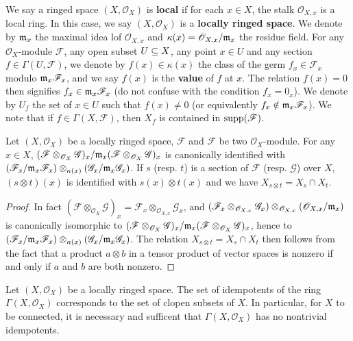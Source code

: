We say a ringed space $(X,\mathscr{O}_X)$ is \textbf{local} if for each $x\in X$, the stalk $\mathscr{O}_{X,x}$ is a local ring. In this case, we say $(X,\mathscr{O}_X)$ is a \textbf{locally ringed space}. We denote by $\mathfrak{m}_x$ the maximal idea lof $\mathscr{O}_{X,x}$ and $\kappa(x)=\mathscr{O}_{X,x}/\mathfrak{m}_x$ the residue field. For any $\mathscr{O}_X$-module $\mathscr{F}$, any open subset $U\subseteq X$, any point $x\in U$ and any section $f\in\Gamma(U,\mathscr{F})$, we denote by $f(x)\in\kappa(x)$ the class of the germ $f_x\in\mathscr{F}_x$ modulo $\mathfrak{m}_x\mathscr{F}_x$, and we say $f(x)$ is the \textbf{value} of $f$ at $x$. The relation $f(x)=0$ then signifies $f_x\in\mathfrak{m}_x\mathscr{F}_x$ (do not confuse with the condition $f_x=0_x$). We denote by $U_f$ the set of $x\in U$ such that $f(x)\neq 0$ (or equivalently $f_x\notin\mathfrak{m}_x\mathscr{F}_x$). We note that if $f\in\Gamma(X,\mathscr{F})$, then $X_f$ is contained in $\mathrm{supp}(\mathscr{F})$.
\begin{proposition}\label{ringed space local residue of tensor char}
Let $(X,\mathscr{O}_X)$ be a locally ringed space, $\mathscr{F}$ and $\mathscr{F}$ be two $\mathscr{O}_X$-module. For any $x\in X$, $(\mathscr{F}\otimes_{\mathscr{O}_X}\mathscr{G})_x/\mathfrak{m}_x(\mathscr{F}\otimes_{\mathscr{O}_X}\mathscr{G})_x$ is canonically identified with $(\mathscr{F}_x/\mathfrak{m}_x\mathscr{F}_x)\otimes_{\kappa(x)}(\mathscr{G}_x/\mathfrak{m}_x\mathscr{G}_x)$. If $s$ (resp. $t$) is a section of $\mathscr{F}$ (resp. $\mathscr{G}$) over $X$, $(s\otimes t)(x)$ is identified with $s(x)\otimes t(x)$ and we have $X_{s\otimes t}=X_s\cap X_t$.
\end{proposition}
\begin{proof}
In fact $(\mathscr{F}\otimes_{\mathscr{O}_X}\mathscr{G})_x=\mathscr{F}_x\otimes_{\mathscr{O}_{X,x}}\mathscr{G}_x$, and $(\mathscr{F}_x\otimes_{\mathscr{O}_{X,x}}\mathscr{G}_x)\otimes_{\mathscr{O}_{X,x}}(\mathscr{O}_{X,x}/\mathfrak{m}_x)$ is canonically isomorphic to $(\mathscr{F}\otimes_{\mathscr{O}_X}\mathscr{G})_x/\mathfrak{m}_x(\mathscr{F}\otimes_{\mathscr{O}_X}\mathscr{G})_x$, hence to $(\mathscr{F}_x/\mathfrak{m}_x\mathscr{F}_x)\otimes_{\kappa(x)}(\mathscr{G}_x/\mathfrak{m}_x\mathscr{G}_x)$. The relation $X_{s\otimes t}=X_s\cap X_t$ then follows from the fact that a product $a\otimes b$ in a tensor product of vector spaces is nonzero if and only if $a$ and $b$ are both nonzero.
\end{proof}
\begin{proposition}\label{ringed space local clopen and idempotents}
Let $(X,\mathscr{O}_X)$ be a locally ringed space. The set of idempotents of the ring $\Gamma(X,\mathscr{O}_X)$ corresponds to the set of clopen subsets of $X$. In particular, for $X$ to be connected, it is necessary and sufficent that $\Gamma(X,\mathscr{O}_X)$ has no nontrivial idempotents.
\end{proposition}
